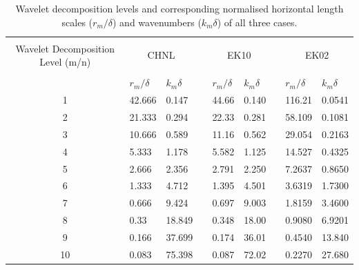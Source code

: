 \begin{table}
	  \caption{Wavelet decomposition levels and corresponding normalised horizontal length scales ($r_m/\delta$) and wavenumbers ($k_m\delta$) of all three cases.}	
	    \centering
		\begin{tabular}{cllllllll}
		\hline \hline\\
		Wavelet Decomposition Level (m/n) &  \multicolumn{2}{c}{CHNL} &  & \multicolumn{2}{c}{EK10} & & \multicolumn{2}{c}{EK02}\\
		\hline \\
		{}   & {$r_{m}/\delta$}   & {$k_m\delta$}  &   & {$r_{m}/\delta$}    & {$k_{m}\delta$} &  & {$r_{m}/\delta$}   & {$k_{m}\delta$} \\
		1  & 42.666 & 0.147   &   &  44.66    & 0.140  &  & 116.21    & 0.0541 \\ 
		2  & 21.333 & 0.294   &   &  22.33    & 0.281  &  & 58.109    & 0.1081 \\
		3  & 10.666 & 0.589   &   &  11.16    & 0.562  &  & 29.054    & 0.2163 \\
		4  & 5.333  & 1.178   &   &  5.582    & 1.125  &  & 14.527    & 0.4325 \\
		5  & 2.666  & 2.356   &   &  2.791    & 2.250  &  & 7.2637    & 0.8650 \\
		6  & 1.333  & 4.712   &   &  1.395    & 4.501  &  & 3.6319    & 1.7300 \\
		7  & 0.666  & 9.424   &   &  0.697    & 9.003  &  & 1.8159    & 3.4600 \\
		8  & 0.33   & 18.849  &   &  0.348    & 18.00  &  & 0.9080    & 6.9201 \\
		9  & 0.166  & 37.699  &   &  0.174    & 36.01  &  & 0.4540    & 13.840 \\
		10 & 0.083  & 75.398  &   &  0.087    & 72.02  &  & 0.2270    & 27.680 \\
		\hline\hline
		\end{tabular}	
	
	\label{tab:wav-mode2scale}
\end{table}
\graphicspath{{chap2Img/}}
